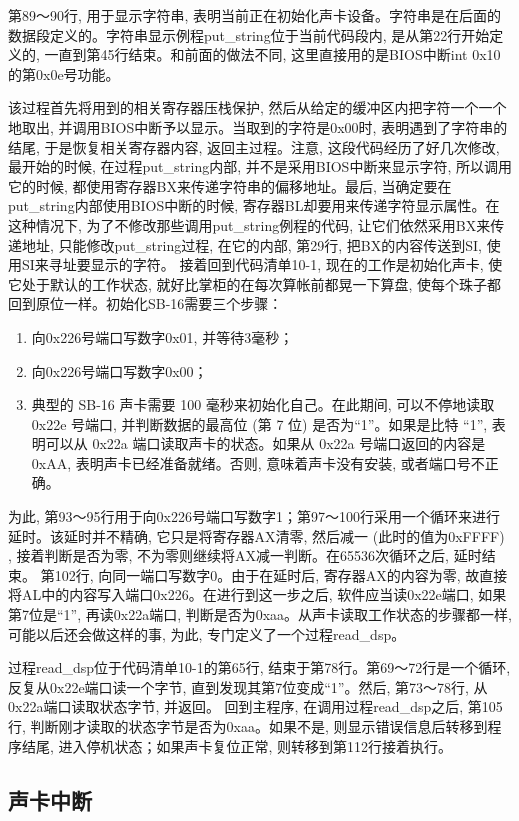 \documentclass[12pt]{article}
\begin{document}
\begin{CJK}{UTF8}{gbsn}
第89～90行, 用于显示字符串, 表明当前正在初始化声卡设备。字符串是在后面的数据段定义的。字符串显示例程put\_{}string位于当前代码段内, 是从第22行开始定义的, 一直到第45行结束。和前面的做法不同, 这里直接用的是BIOS中断int 0x10的第0x0e号功能。

该过程首先将用到的相关寄存器压栈保护, 然后从给定的缓冲区内把字符一个一个地取出, 并调用BIOS中断予以显示。当取到的字符是0x00时, 表明遇到了字符串的结尾, 于是恢复相关寄存器内容, 返回主过程。注意, 这段代码经历了好几次修改, 最开始的时候, 在过程put\_{}string内部, 并不是采用BIOS中断来显示字符, 所以调用它的时候, 都使用寄存器BX来传递字符串的偏移地址。最后, 当确定要在put\_{}string内部使用BIOS中断的时候, 寄存器BL却要用来传递字符显示属性。在这种情况下, 为了不修改那些调用put\_{}string例程的代码, 让它们依然采用BX来传递地址, 只能修改put\_{}string过程, 在它的内部, 第29行, 把BX的内容传送到SI, 使用SI来寻址要显示的字符。
接着回到代码清单10-1, 现在的工作是初始化声卡, 使它处于默认的工作状态, 就好比掌柜的在每次算帐前都晃一下算盘, 使每个珠子都回到原位一样。初始化SB-16需要三个步骤：
\begin{enumerate}
\item 向0x226号端口写数字0x01, 并等待3毫秒；
\item 向0x226号端口写数字0x00；
\item 典型的 SB-16 声卡需要 100 毫秒来初始化自己。在此期间, 可以不停地读取
0x22e 号端口, 并判断数据的最高位 (第 7 位) 是否为``1''。如果是比特 ``1'', 表明可以从
0x22a 端口读取声卡的状态。如果从 0x22a 号端口返回的内容是 0xAA, 表明声卡已经准备就绪。否则,
意味着声卡没有安装, 或者端口号不正确。
\end{enumerate}
为此, 第93～95行用于向0x226号端口写数字1；第97～100行采用一个循环来进行延时。该延时并不精确, 它只是将寄存器AX清零, 然后减一 (此时的值为0xFFFF) , 接着判断是否为零, 不为零则继续将AX减一判断。在65536次循环之后, 延时结束。
第102行, 向同一端口写数字0。由于在延时后, 寄存器AX的内容为零, 故直接将AL中的内容写入端口0x226。在进行到这一步之后, 软件应当读0x22e端口, 如果第7位是“1”, 再读0x22a端口, 判断是否为0xaa。从声卡读取工作状态的步骤都一样, 可能以后还会做这样的事, 为此, 专门定义了一个过程read\_{}dsp。

过程read\_{}dsp位于代码清单10-1的第65行, 结束于第78行。第69～72行是一个循环, 反复从0x22e端口读一个字节, 直到发现其第7位变成“1”。然后, 第73～78行, 从0x22a端口读取状态字节, 并返回。
回到主程序, 在调用过程read\_{}dsp之后, 第105行, 判断刚才读取的状态字节是否为0xaa。如果不是, 则显示错误信息后转移到程序结尾, 进入停机状态；如果声卡复位正常, 则转移到第112行接着执行。

\subsection{声卡中断}

\end{CJK}
\end{document}
